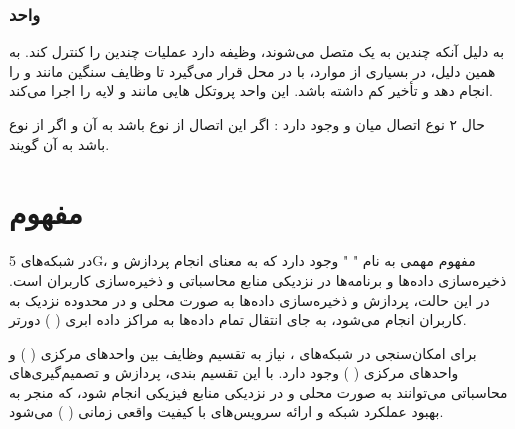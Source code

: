 \documentclass[landscape, 12pt]{report}
\begin{document}
\subsubsection*{واحد 
	}
به دلیل آنکه چندین
  به یک
    متصل می‌شوند،
      وظیفه دارد عملیات چندین
        را کنترل ‌کند. به همین دلیل، در بسیاری از موارد،
          با
            در محل قرار می‌گیرد تا وظایف سنگین مانند
              و
                را انجام دهد و تأخیر کم داشته باشد. این واحد پروتکل هایی مانند
                  و لایه
                    را اجرا می‌کند.
                    
حال ۲ نوع اتصال میان
  و
    وجود دارد :
اگر این اتصال از نوع
  باشد به آن
    و اگر از نوع
      باشد به آن
        گویند.
        
 \section*{مفهوم 
 	}
در شبکه‌های 5G، مفهوم مهمی به نام "
" وجود دارد که به معنای انجام پردازش و ذخیره‌سازی داده‌ها و برنامه‌ها در نزدیکی منابع محاسباتی و ذخیره‌سازی کاربران است. در این حالت، پردازش و ذخیره‌سازی داده‌ها به صورت محلی و در محدوده نزدیک به کاربران انجام می‌شود، به جای انتقال تمام داده‌ها به مراکز داده ابری ( 
) دورتر.

برای امکان‌سنجی
  در شبکه‌های
   ، نیاز به تقسیم وظایف بین واحدهای مرکزی (
   ) و واحدهای مرکزی (
	 ) وجود دارد. با این تقسیم بندی، پردازش و تصمیم‌گیری‌های محاسباتی می‌توانند به صورت محلی و در نزدیکی منابع فیزیکی انجام شود، که منجر به بهبود عملکرد شبکه و ارائه سرویس‌های با کیفیت واقعی زمانی (
	 ) می‌شود.
	 
\end{document}
